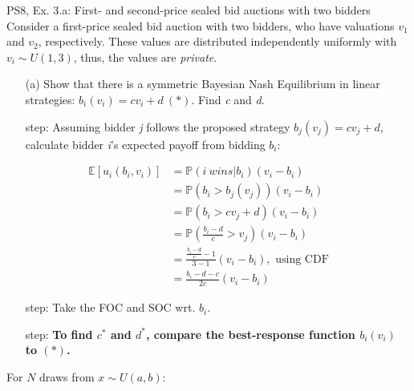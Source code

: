 \begin{frame}{PS8, Ex. 3.a: First- and second-price sealed bid auctions with two bidders}
    Consider a first-price sealed bid auction with two bidders, who have valuations $v_1$ and $v_2$, respectively. These values are distributed independently uniformly with $v_i\sim U(1,3)$, thus, the values are \textit{private}.
    \vspace{-4pt}
    \begin{itemize}
      \item[(a)] Show that there is a symmetric Bayesian Nash Equilibrium in linear strategies: $b_i(v_i) = cv_i + d\ (*)$. Find \textit{c} and \textit{d}.
    \end{itemize}
    \vspace{-8pt}
    \begin{multicols}{2}
      \begin{itemize}
        \item[\nth{1} step:] Assuming bidder \textit{j} follows the proposed strategy $b_j(v_j) = cv_j + d$, calculate bidder \textit{i}'s expected payoff from bidding $b_i$:
      \end{itemize}
      \vspace{-12pt}
      \begin{align*}
        \mathbb{E}[u_i(b_i,v_i)]&=\mathbb{P}(i\ wins|b_i)(v_i-b_i)\\
                                &=\mathbb{P}(b_i>b_j(v_j))(v_i-b_i)\\
                                &=\mathbb{P}(b_i>cv_j+d)(v_i-b_i)\\
                                &=\mathbb{P}\left(\frac{b_i-d}{c}>v_j\right)(v_i-b_i)\\
                                &=\frac{\frac{b_i-d}{c}-1}{3-1}(v_i-b_i),\text{ using CDF}\\
                                &=\frac{b_i-d-c}{2c}(v_i-b_i)
      \end{align*}
      \vspace{-18pt}
      \begin{itemize}
        \item[\nth{2} step:] Take the FOC and SOC wrt. $b_i$.
        \item[\nth{3} step:] \textbf{To find $c^*$ and $d^*$, compare the best-response function $b_i(v_i)$ to $(*)$.}
      \end{itemize}
      \vfill\null\columnbreak
      For $N$ draws from $x\sim U(a, b):$
      \vspace{-6pt}
      \begin{enumerate}

\end{enumerate}
\end{multicols}
\end{frame}
